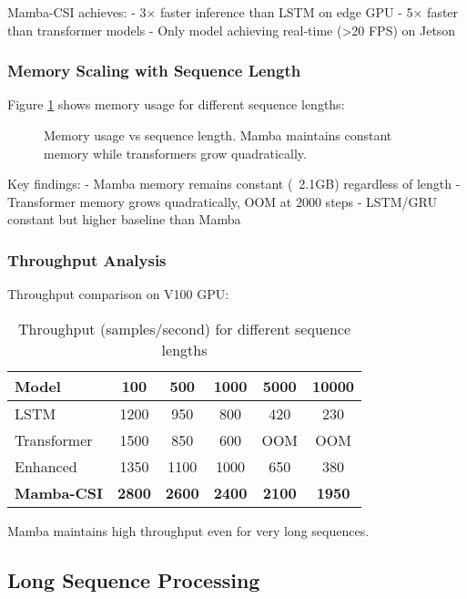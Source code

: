 \documentclass[10pt,journal,compsoc]{IEEEtran}
\begin{document}
Mamba-CSI achieves:
- 3× faster inference than LSTM on edge GPU
- 5× faster than transformer models
- Only model achieving real-time (>20 FPS) on Jetson

\subsubsection{Memory Scaling with Sequence Length}

Figure \ref{fig:memory_scaling} shows memory usage for different sequence lengths:

\begin{figure}[h]
\centering
\framebox[0.45\textwidth]{\rule{0pt}{3cm}}
\caption{Memory usage vs sequence length. Mamba maintains constant memory while transformers grow quadratically.}
\label{fig:memory_scaling}
\end{figure}

Key findings:
- Mamba memory remains constant (~2.1GB) regardless of length
- Transformer memory grows quadratically, OOM at 2000 steps
- LSTM/GRU constant but higher baseline than Mamba

\subsubsection{Throughput Analysis}

Throughput comparison on V100 GPU:

\begin{table}[h]
\centering
\caption{Throughput (samples/second) for different sequence lengths}
\label{tab:throughput}
\begin{tabular}{lccccc}
\toprule
Model & 100 & 500 & 1000 & 5000 & 10000 \\
\midrule
LSTM & 1200 & 950 & 800 & 420 & 230 \\
Transformer & 1500 & 850 & 600 & OOM & OOM \\
Enhanced & 1350 & 1100 & 1000 & 650 & 380 \\
\textbf{Mamba-CSI} & \textbf{2800} & \textbf{2600} & \textbf{2400} & \textbf{2100} & \textbf{1950} \\
\bottomrule
\end{tabular}
\end{table}

Mamba maintains high throughput even for very long sequences.

\subsection{Long Sequence Processing}
\end{document}
